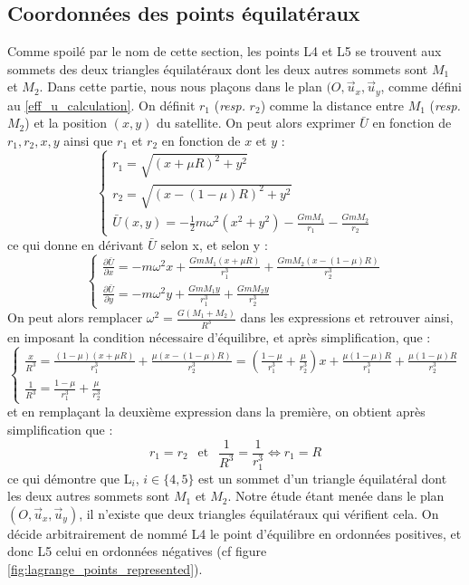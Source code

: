 \documentclass[12pt]{article}
\theoremstyle{definition}
\theoremstyle{definition}
\begin{document}
	\subsection{Coordonnées des points équilatéraux}
	Comme spoilé par le nom de cette section, les points L4 et L5 se trouvent aux sommets des deux triangles équilatéraux dont les deux autres sommets sont $M_1$ et $M_2$. Dans cette partie, nous nous plaçons dans le plan $(O,\vec{u}_x,\vec{u}_y$, comme défini au \ref{eff_u_calculation}. On définit $r_1$ (\textit{resp.} $r_2$) comme la distance entre $M_1$ (\textit{resp.} $M_2$) et la position $(x,y)$ du satellite. On peut alors exprimer $\bar{U}$ en fonction de $r_1,r_2,x,y$ ainsi que $r_1$ et $r_2$ en fonction de $x$ et $y$ :
	\begin{equation}
		\label{equi_underived_eq}
		\begin{cases}
			r_1=\sqrt{(x+\mu R)^2+y^2}
			\\ r_2 = \sqrt{(x-(1-\mu)R)^2+y^2}
			\\ \bar{U}(x,y)=-\frac{1}{2}m\omega^2(x^2+y^2)-\frac{GmM_1}{r_1}-\frac{GmM_2}{r_2}
		\end{cases}
	\end{equation}
	ce qui donne en dérivant $\bar{U}$ selon x, et selon y :
	\begin{equation}
		\label{equi_derived_eq}
		\begin{cases}
			\frac{\partial \bar{U}}{\partial x} = -m\omega^2x+\frac{GmM_1(x+\mu R)}{r_1^3}+\frac{GmM_2(x-(1-\mu)R)}{r_2^3}
			\\
			\frac{\partial \bar{U}}{\partial y} = -m\omega^2y+\frac{GmM_1y}{r_1^3}+\frac{GmM_2y}{r_2^3}
		\end{cases}
	\end{equation}
	On peut alors remplacer $\omega^2 = \frac{G(M_1+M_2)}{R^3}$ dans les expressions et retrouver ainsi, en imposant la condition nécessaire d'équilibre, et après simplification, que :
	\begin{equation}
		\begin{cases}
			\label{equilateral_CN}
			\frac{x}{R^3}=\frac{(1-\mu)(x+\mu R)}{r_1^3}+\frac{\mu(x-(1-\mu)R)}{r_2^3}=(\frac{1-\mu}{r_1^3}+\frac{\mu}{r_2^3})x+\frac{\mu(1-\mu)R}{r_1^3}+\frac{\mu(1-\mu)R}{r_2^3}
			\\
			\frac{1}{R^3}=\frac{1-\mu}{r_1^3}+\frac{\mu}{r_2^3}
		\end{cases}
	\end{equation}
	et en remplaçant la deuxième expression dans la première, on obtient après simplification que :
	\begin{equation}
		\label{equilateral_result}
		r_1=r_2 \ \ \text{ et } \ \ \frac{1}{R^3} = \frac{1}{r_1^3} \iff r_1 = R
	\end{equation}
	ce qui démontre que L$_i$, $i \in \{4,5\}$ est un sommet d'un triangle équilatéral dont les deux autres sommets sont $M_1$ et $M_2$. Notre étude étant menée dans le plan $(O,\vec{u}_x,\vec{u}_y)$, il n'existe que deux triangles équilatéraux qui vérifient cela. On décide arbitrairement de nommé L4 le point d'équilibre en ordonnées positives, et donc L5 celui en ordonnées négatives (cf figure \ref{fig:lagrange_points_represented}).
	
\end{document}
